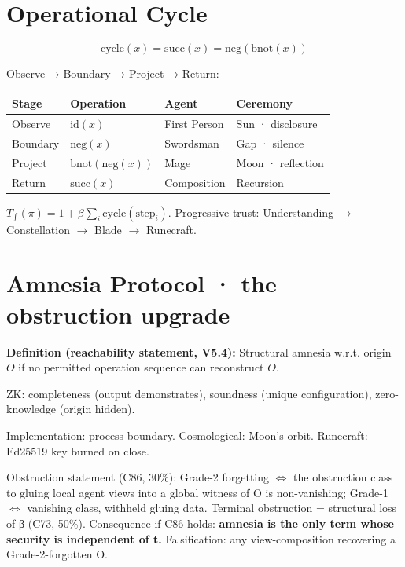 \documentclass[
  11pt,
]{article}
\newcounter{none} %
\begin{document}
\section{Operational Cycle}\label{operational-cycle}

\[\text{cycle}(x) = \text{succ}(x) = \text{neg}(\text{bnot}(x))\]

Observe → Boundary → Project → Return:

{\def\LTcaptype{none} %
\begin{longtable}[]{@{}llll@{}}
\toprule\noalign{}
Stage & Operation & Agent & Ceremony \\
\midrule\noalign{}
\endhead
\bottomrule\noalign{}
\endlastfoot
Observe & \(\text{id}(x)\) & First Person & Sun · disclosure \\
Boundary & \(\text{neg}(x)\) & Swordsman & Gap · silence \\
Project & \(\text{bnot}(\text{neg}(x))\) & Mage & Moon · reflection \\
Return & \(\text{succ}(x)\) & Composition & Recursion \\
\end{longtable}
}

\(T_{\!\int}(\pi) = 1 + \beta \sum_i \text{cycle}(\text{step}_i)\).
Progressive trust: Understanding \(\to\) Constellation \(\to\) Blade
\(\to\) Runecraft.

\section{Amnesia Protocol · the obstruction
upgrade}\label{amnesia-protocol-the-obstruction-upgrade}

\textbf{Definition (reachability statement, V5.4):} Structural amnesia
w.r.t. origin \(O\) if no permitted operation sequence can reconstruct
\(O\).

ZK: completeness (output demonstrates), soundness (unique
configuration), zero-knowledge (origin hidden).

Implementation: process boundary. Cosmological: Moon's orbit. Runecraft:
Ed25519 key burned on close.

Obstruction statement (C86, 30\%): Grade-2 forgetting \(\iff\) the
obstruction class to gluing local agent views into a global witness of O
is non-vanishing; Grade-1 \(\iff\) vanishing class, withheld gluing
data. Terminal obstruction = structural loss of β (C73, 50\%).
Consequence if C86 holds: \textbf{amnesia is the only term whose
security is independent of t.} Falsification: any view-composition
recovering a Grade-2-forgotten O.
\end{document}
